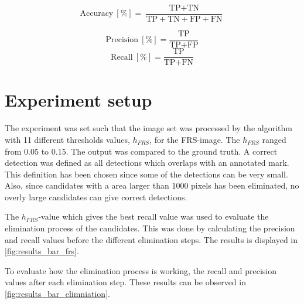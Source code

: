 \begin{equation} \label{eq:accuracy}
\text{Accuracy} \: [\%] = \frac{\text{TP} + \text{TN}}{\text{TP}+\text{TN}+\text{FP}+\text{FN}}
\end{equation}

\begin{equation} \label{eq:precision}
\text{Precision} \: [\%] = \frac{\text{TP}}{\text{TP}+\text{FP}}
\end{equation}
\begin{equation} \label{eq:recall}
\text{Recall} \: [\%] = \frac{\text{TP}}{\text{TP}+\text{FN}}
\end{equation}

%




\section{Experiment setup}

The experiment was set such that the image set was processed by the algorithm with 11 different thresholds values, $h_{FRS}$, for the FRS-image. The $h_{FRS}$ ranged from $0.05$ to $0.15$. The output was compared to the ground truth. A correct detection was defined as all detections which overlaps with an annotated mark. This definition has been chosen since some of the detections can be very small. Also, since candidates with a area larger than 1000 pixels has been eliminated, no overly large candidates can give correct detections.   

The $h_{FRS}$-value which gives the best recall value was used to evaluate the elimination process of the candidates. This was done by calculating the precision and recall values before the different elimination steps. The results is displayed in \cref{fig:results_bar_frs}.

To evaluate how the elimination process is working, the recall and precision values after each elimination step. These results can be observed in \cref{fig:results_bar_elimniation}.

